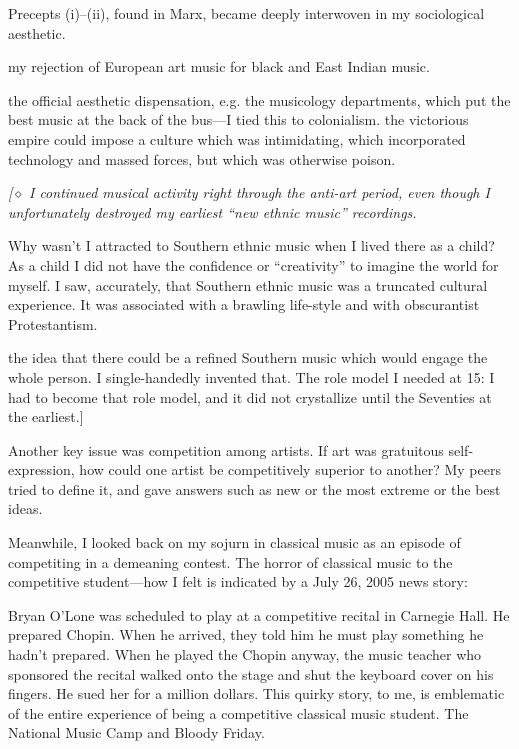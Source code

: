 Precepts (i)--(ii), found in Marx, became deeply interwoven in my sociological aesthetic. 

my rejection of European art music for black and East Indian music.  

the official aesthetic dispensation, e.g. the musicology departments, which put the best music at the back of the bus---I tied this to colonialism.  the victorious empire could impose a culture which was intimidating, which incorporated technology and massed forces, but which was otherwise poison.

\Pb 

{\itshape\footnotesize[$\diamond$ I continued musical activity right through the anti-art period, even though I unfortunately destroyed my earliest \enquote{new ethnic music} recordings.

Why wasn't I attracted to Southern ethnic music when I lived there as a child?  As a child I did not have the confidence or \enquote{creativity} to imagine the world for myself.  I saw, accurately, that Southern ethnic music was a truncated cultural experience.  It was associated with a brawling life-style and with obscurantist Protestantism. 

the idea that there could be a refined Southern music which would engage the whole person.  I single-handedly invented that.  The role model I needed at 15:  I had to become that role model, and it did not crystallize until the Seventies at the earliest.]}

\Pb 
 
Another key issue was competition among artists.  If art was gratuitous self-expression, how could one artist be competitively superior to another?  My peers tried to define it, and gave answers such as new or the most extreme or the best ideas.

Meanwhile, I looked back on my sojurn in classical music as an episode of competiting in a demeaning contest.  The horror of classical music to the competitive student---how I felt is indicated by a July 26, 2005 news story:

Bryan O'Lone was scheduled to play at a competitive recital in Carnegie Hall.  He prepared Chopin.  When he arrived, they told him he must play something he hadn't prepared.  When he played the Chopin anyway, the music teacher who sponsored the recital walked onto the stage and shut the keyboard cover on his fingers.  He sued her for a million dollars.  This quirky story, to me, is emblematic of the entire experience of being a competitive classical music student.  The National Music Camp and Bloody Friday.

